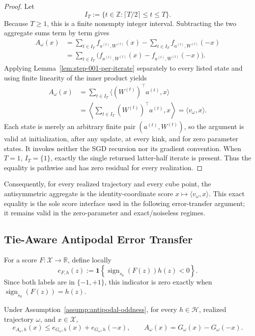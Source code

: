 \begin{proof}
Let
\[
 I_T:=\{t\in\mathbb Z:\lceil T/2\rceil\leq t\leq T\}.
\]
Because $T\geq1$, this is a finite nonempty integer interval.  Subtracting
the two aggregate sums term by term gives
\[
\begin{aligned}
 A_\omega(x)
 &=\sum_{t\in I_T}f_{a^{(t)},W^{(t)}}(x)
   -\sum_{t\in I_T}f_{a^{(t)},W^{(t)}}(-x)\\
 &=\sum_{t\in I_T}
   \bigl(f_{a^{(t)},W^{(t)}}(x)
       -f_{a^{(t)},W^{(t)}}(-x)\bigr).
\end{aligned}
\]
Applying Lemma~\ref{lem:step-001-per-iterate} separately to every listed
state and using finite linearity of the inner product yields
\[
\begin{aligned}
 A_\omega(x)
 &=\sum_{t\in I_T}\langle(W^{(t)})^\top a^{(t)},x\rangle\\
 &=\left\langle\sum_{t\in I_T}(W^{(t)})^\top a^{(t)},x\right\rangle
 =\langle v_\omega,x\rangle.
\end{aligned}
\]
Each state is merely an arbitrary finite pair $(a^{(t)},W^{(t)})$, so the
argument is valid at initialization, after any update, at every kink, and for
zero parameter states.  It invokes neither the SGD recursion nor its gradient
convention.  When $T=1$, $I_T=\{1\}$, exactly the single returned
latter-half iterate is present.  Thus the equality is pathwise and has zero
residual for every realization.
\end{proof}

Consequently, for every realized trajectory and every cube point, the
antisymmetric aggregate is the identity-coordinate score
$x\mapsto\langle v_\omega,x\rangle$.  This exact equality is the sole score
interface used in the following error-transfer argument; it remains valid in
the zero-parameter and exact/noiseless regimes.

\subsection{Tie-Aware Antipodal Error Transfer}
\label{app:error-transfer}

For a score $F:\mathcal X\to\mathbb R$, define locally
\[
 e_{F,h}(z):=\mathbf 1\!\left\{
 \operatorname{sign}_{s_0}(F(z))h(z)<0\right\}.
\]
Since both labels are in $\{-1,+1\}$, this indicator is zero exactly when
$\operatorname{sign}_{s_0}(F(z))=h(z)$.

\begin{lemma}
\label{lem:step-002-pair-error}
Under Assumption~\ref{assump:antipodal-oddness}, for every
$h\in\mathcal H$, realized trajectory $\omega$, and $x\in\mathcal X$,
\[
 e_{A_\omega,h}(x)
 \leq e_{G_\omega,h}(x)+e_{G_\omega,h}(-x),
 \qquad A_\omega(x)=G_\omega(x)-G_\omega(-x).
\]
\end{lemma}

